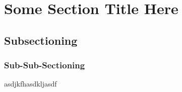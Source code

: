 \section{Some Section Title Here}
\subsection{Subsectioning}
\subsubsection{Sub-Sub-Sectioning}
asdjkfhasdkljasdf